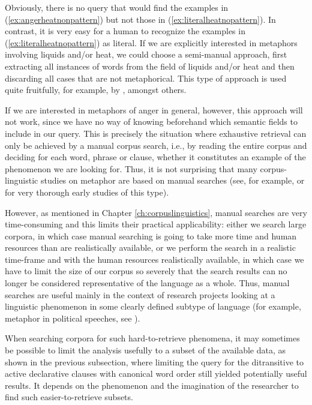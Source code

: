 Obviously, there is no query that would find the examples in (\ref{ex:angerheatnonpattern}) but not those in (\ref{ex:literalheatnopattern}). In contrast, it is very easy for a human to recognize the examples in (\ref{ex:literalheatnopattern}) as literal. If we are explicitly interested in metaphors involving liquids and/or heat, we could choose a semi-manual approach, first extracting all instances of words from the field of liquids and/or heat and then discarding all cases that are not metaphorical. This type of approach is used quite fruitfully, for example, by \citet{deignan_metaphor_2005}, amongst others.

If we are interested in metaphors of anger in general, however, this approach will not work, since we have no way of knowing beforehand which semantic fields to include in our query. This is precisely the situation where exhaustive retrieval can only be achieved by a manual corpus search, i.e., by reading the entire corpus and deciding for each word, phrase or clause, whether it constitutes an example of the phenomenon we are looking for. Thus, it is not surprising that many corpus-linguistic studies on metaphor are based on manual searches (see, for example, \citet{semino_politics_1996} or \citet{jakel_metaphern_1997} for very thorough early studies of this type).

However, as mentioned in Chapter \ref{ch:corpuslinguistics}, manual searches are very time\hyp{}consuming and this limits their practical applicability: either we search large corpora, in which case manual searching is going to take more time and human resources than are realistically available, or we perform the search in a realistic time-frame and with the human resources realistically available, in which case we have to limit the size of our corpus so severely that the search results can no longer be considered representative of the language as a whole. Thus, manual searches are useful mainly in the context of research projects looking at a linguistic phenomenon in some clearly defined subtype of language (for example, metaphor in political speeches, see \citet{charteris-black_politicians_2005}).

When searching corpora for such hard-to-retrieve phenomena, it may sometimes be possible to limit the analysis usefully to a subset of the available data, as shown in the previous subsection, where limiting the query for the ditransitive to active declarative clauses with canonical word order still yielded potentially useful results. It depends on the phenomenon and the imagination of the researcher to find such easier-to-retrieve subsets.

